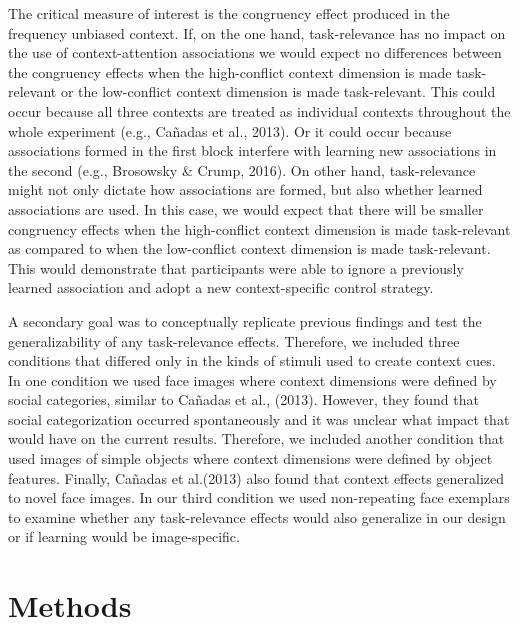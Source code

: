\documentclass[english,,man,floatsintext]{apa6}
\begin{document}
The critical measure of interest is the congruency effect produced in
the frequency unbiased context. If, on the one hand, task-relevance has
no impact on the use of context-attention associations we would expect
no differences between the congruency effects when the high-conflict
context dimension is made task-relevant or the low-conflict context
dimension is made task-relevant. This could occur because all three
contexts are treated as individual contexts throughout the whole
experiment (e.g., Cañadas et al., 2013). Or it could occur because
associations formed in the first block interfere with learning new
associations in the second (e.g., Brosowsky \& Crump, 2016). On other
hand, task-relevance might not only dictate how associations are formed,
but also whether learned associations are used. In this case, we would
expect that there will be smaller congruency effects when the
high-conflict context dimension is made task-relevant as compared to
when the low-conflict context dimension is made task-relevant. This
would demonstrate that participants were able to ignore a previously
learned association and adopt a new context-specific control strategy.

A secondary goal was to conceptually replicate previous findings and
test the generalizability of any task-relevance effects. Therefore, we
included three conditions that differed only in the kinds of stimuli
used to create context cues. In one condition we used face images where
context dimensions were defined by social categories, similar to Cañadas
et al., (2013). However, they found that social categorization occurred
spontaneously and it was unclear what impact that would have on the
current results. Therefore, we included another condition that used
images of simple objects where context dimensions were defined by object
features. Finally, Cañadas et al.(2013) also found that context effects
generalized to novel face images. In our third condition we used
non-repeating face exemplars to examine whether any task-relevance
effects would also generalize in our design or if learning would be
image-specific.

\section{Methods}\label{methods}
\end{document}
